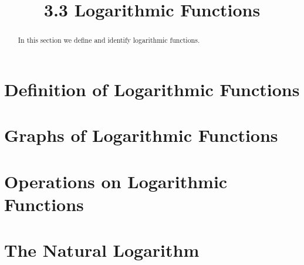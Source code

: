 \documentclass[handout]{ximera}
\title{3.3 Logarithmic Functions}
\begin{document}
\begin{abstract}
In this section we define and identify logarithmic functions.
\end{abstract}

\maketitle


\section{Definition of Logarithmic Functions}




\section{Graphs of Logarithmic Functions}


\section{Operations on Logarithmic Functions}

\section{The Natural Logarithm}
\end{document}

